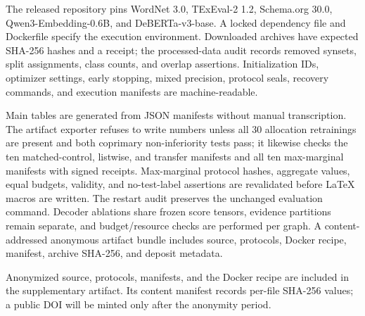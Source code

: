 \documentclass[11pt]{article}
\begin{document}
The released repository pins WordNet 3.0, TExEval-2 1.2, Schema.org 30.0,
Qwen3-Embedding-0.6B, and DeBERTa-v3-base. A locked dependency file and
Dockerfile specify the execution environment. Downloaded archives have expected
SHA-256 hashes and a receipt; the processed-data audit records removed synsets,
split assignments, class counts, and overlap assertions. Initialization IDs, optimizer
settings, early stopping, mixed precision, protocol seals, recovery commands,
and execution manifests are machine-readable.

Main tables are generated from JSON manifests without manual transcription.
The artifact exporter refuses to write numbers unless all 30 allocation
retrainings are present and both coprimary non-inferiority tests pass; it likewise
checks the ten matched-control, listwise, and transfer manifests and all ten max-marginal
manifests with signed receipts. Max-marginal protocol hashes, aggregate values,
equal budgets, validity, and no-test-label assertions are revalidated before
LaTeX macros are written. The restart audit preserves the unchanged evaluation
command. Decoder ablations share frozen score tensors, evidence partitions
remain separate, and
budget/resource checks are performed per graph. A content-addressed anonymous
artifact bundle includes source, protocols, Docker recipe, manifest, archive
SHA-256, and deposit metadata.

Anonymized source, protocols, manifests, and the Docker recipe are included
in the supplementary artifact. Its content manifest records per-file SHA-256
values; a public DOI will be minted only after the anonymity period.
\end{document}
